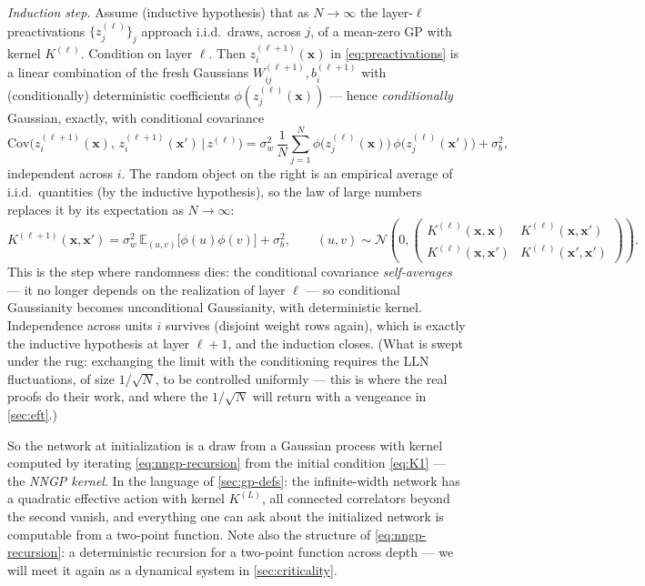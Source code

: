 \documentclass[11pt]{article}
\newcommand{\E}{\mathbb{E}}
\newcommand{\bv}[1]{\boldsymbol{#1}}
\begin{document}
\emph{Induction step.} Assume (inductive hypothesis) that as
$N \to \infty$ the layer-$\ell$ preactivations $\{z^{(\ell)}_j\}_j$
approach i.i.d.\ draws, across $j$, of a mean-zero GP with kernel
$K^{(\ell)}$. Condition on layer $\ell$. Then $z^{(\ell+1)}_i(\bv{x})$
in \cref{eq:preactivations} is a linear combination of the fresh
Gaussians $W^{(\ell+1)}_{ij}, b^{(\ell+1)}_i$ with (conditionally)
deterministic coefficients $\phi(z_j^{(\ell)}(\bv{x}))$ --- hence
\emph{conditionally} Gaussian, exactly, with conditional covariance
\begin{equation}
  \label{eq:conditional-cov}
  \mathrm{Cov}\bigl(z^{(\ell+1)}_i(\bv{x}),\,
  z^{(\ell+1)}_i(\bv{x}')\,\big|\, z^{(\ell)}\bigr)
  = \sigma_w^2\, \frac{1}{N} \sum_{j=1}^{N}
  \phi\bigl(z^{(\ell)}_j(\bv{x})\bigr)\,
  \phi\bigl(z^{(\ell)}_j(\bv{x}')\bigr) + \sigma_b^2 ,
\end{equation}
independent across $i$. The random object on the right is an empirical
average of i.i.d.\ quantities (by the inductive hypothesis), so the law
of large numbers replaces it by its expectation as $N \to \infty$:
\begin{equation}
  \label{eq:nngp-recursion}
  K^{(\ell+1)}(\bv{x},\bv{x}') = \sigma_w^2\,
  \E_{(u,v)}\bigl[\phi(u)\phi(v)\bigr] + \sigma_b^2,
  \qquad
  (u,v) \sim \mathcal{N}\!\left(0,
  \begin{pmatrix} K^{(\ell)}(\bv{x},\bv{x}) & K^{(\ell)}(\bv{x},\bv{x}')\\
  K^{(\ell)}(\bv{x},\bv{x}') & K^{(\ell)}(\bv{x}',\bv{x}') \end{pmatrix}
  \right).
\end{equation}
This is the step where randomness dies: the conditional covariance
\emph{self-averages} --- it no longer depends on the realization of layer
$\ell$ --- so conditional Gaussianity becomes unconditional Gaussianity,
with deterministic kernel. Independence across units $i$ survives
(disjoint weight rows again), which is exactly the inductive hypothesis
at layer $\ell + 1$, and the induction closes. (What is swept under the
rug: exchanging the limit with the conditioning requires the
LLN fluctuations, of size $1/\sqrt{N}$, to be controlled uniformly ---
this is where the real proofs \cite{neal1996bayesian,lee2018deep} do
their work, and where the $1/\sqrt N$ will return with a vengeance in
\cref{sec:eft}.)

So the network at initialization is a draw from a Gaussian process with
kernel computed by iterating \cref{eq:nngp-recursion} from the initial
condition \cref{eq:K1} --- the \emph{NNGP kernel}. In the language of
\cref{sec:gp-defs}: the infinite-width network has a quadratic effective
action with kernel $K^{(L)}$, all connected correlators beyond the second
vanish, and everything one can ask about the initialized network is
computable from a two-point function. Note also the structure of
\cref{eq:nngp-recursion}: a deterministic recursion for a two-point
function across depth --- we will meet it again as a dynamical system in
\cref{sec:criticality}.
\end{document}
